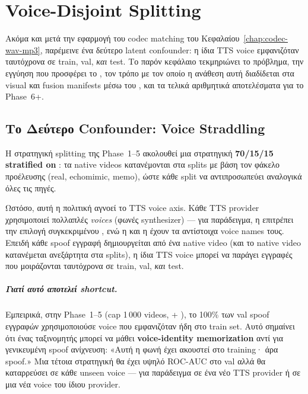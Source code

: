 \chapter{Voice-Disjoint Splitting}
\label{chap:voice-split}

Ακόμα και μετά την εφαρμογή του codec matching του Κεφαλαίου~\ref{chap:codec-wav-mp3},
παρέμεινε ένα δεύτερο latent confounder:
η ίδια TTS voice εμφανιζόταν ταυτόχρονα σε train, val, \emph{και} test.
Το παρόν κεφάλαιο τεκμηριώνει το πρόβλημα,
την εγγύηση που προσφέρει το ,
τον τρόπο με τον οποίο η ανάθεση αυτή διαδίδεται στα visual και fusion manifests
μέσω του ,
και τα τελικά αριθμητικά αποτελέσματα για το Phase~6+.

\section{Το Δεύτερο Confounder: Voice Straddling}
\label{sec:voice-straddling}

Η στρατηγική splitting της Phase~1–5 ακολουθεί μια στρατηγική
\textbf{70/15/15 stratified on }:
τα native videos κατανέμονται στα splits με βάση τον φάκελο προέλευσης
(real, echomimic, memo),
ώστε κάθε split να αντιπροσωπεύει αναλογικά όλες τις πηγές.

Ωστόσο, αυτή η πολιτική αγνοεί το TTS voice axis.
Κάθε TTS provider χρησιμοποιεί πολλαπλές \emph{voices}
(φωνές synthesizer) — για παράδειγμα,
η  επιτρέπει την επιλογή συγκεκριμένου
,
ενώ η  και η 
έχουν τα αντίστοιχα voice names τους.
Επειδή κάθε spoof εγγραφή δημιουργείται από ένα native video
(και το native video κατανέμεται ανεξάρτητα στα splits),
η ίδια TTS voice μπορεί να παράγει εγγραφές
που μοιράζονται ταυτόχρονα σε train, val, \emph{και} test.

\paragraph{Γιατί αυτό αποτελεί shortcut.}
Εμπειρικά, στην Phase~1–5 (cap 1\,000 videos,
 + ),
το 100\% των val spoof εγγραφών χρησιμοποιούσε voice
που εμφανιζόταν ήδη στο train set.
Αυτό σημαίνει ότι ένας ταξινομητής μπορεί να μάθει
\textbf{voice-identity memorization} αντί για γενικευμένη spoof ανίχνευση:
«Αυτή η φωνή έχει ακουστεί στο training· άρα spoof.»
Μια τέτοια στρατηγική θα έχει υψηλό ROC-AUC στο val
αλλά θα καταρρεύσει σε κάθε unseen voice — για παράδειγμα
σε ένα νέο TTS provider ή σε μια νέα voice του ίδιου provider.

